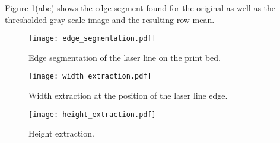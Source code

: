 \documentclass[10pt,letter]{article}
\begin{document}
Figure \ref{fig: edge_segmentation}(abc) shows the edge segment found for the original as well as the thresholded gray scale image and the resulting row mean.
\begin{figure}[!ht]
\centering
\texttt{[image: edge\_segmentation.pdf]} 
\caption{Edge segmentation of the laser line on the print bed.}
\label{fig: edge_segmentation}
\end{figure}


\begin{figure}[!ht]
\centering
\texttt{[image: width\_extraction.pdf]} 
\caption{Width extraction at the position of the laser line edge.}
\label{fig: width_extraction}
\end{figure}

\begin{figure}[!ht]
\centering
\texttt{[image: height\_extraction.pdf]} 
\caption{Height extraction.}
\label{fig: height_extraction}
\end{figure}
\end{document}
